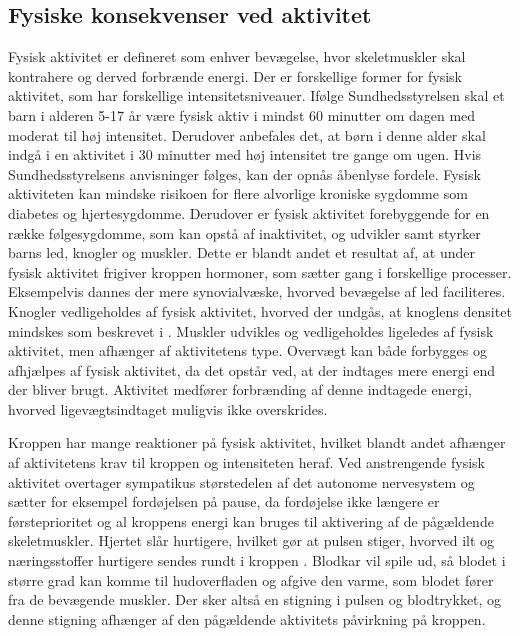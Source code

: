 \subsection{Fysiske konsekvenser ved aktivitet}\label{subsec:fysio_aktivitet}
Fysisk aktivitet er defineret som enhver bevægelse, hvor skeletmuskler skal kontrahere og derved forbrænde energi. Der er forskellige former for fysisk aktivitet, som har forskellige intensitetsniveauer. \citep{Academic2016a} Ifølge Sundhedsstyrelsen skal et barn i alderen 5-17 år være fysisk aktiv i mindst 60 minutter om dagen med moderat til høj intensitet. Derudover anbefales det, at børn i denne alder skal indgå i en aktivitet i 30 minutter med høj intensitet tre gange om ugen. \citep{Sundhedsstyrelsen2016} Hvis Sundhedsstyrelsens anvisninger følges, kan der opnås åbenlyse fordele. Fysisk aktiviteten kan mindske risikoen for flere alvorlige kroniske sygdomme som diabetes og hjertesygdomme. Derudover er fysisk aktivitet forebyggende for en række følgesygdomme, som kan opstå af inaktivitet, og udvikler samt styrker barns led, knogler og muskler. Dette er blandt andet et resultat af, at under fysisk aktivitet frigiver kroppen hormoner, som sætter gang i forskellige processer. Eksempelvis dannes der mere synovialvæske, hvorved bevægelse af led faciliteres. Knogler vedligeholdes af fysisk aktivitet, hvorved der undgås, at knoglens densitet mindskes som beskrevet i . Muskler udvikles og vedligeholdes ligeledes af fysisk aktivitet, men afhænger af aktivitetens type. Overvægt kan både forbygges og afhjælpes af fysisk aktivitet, da det opstår ved, at der indtages mere energi end der bliver brugt. Aktivitet medfører forbrænding af denne indtagede energi, hvorved ligevægtsindtaget muligvis ikke overskrides. \citep{Academic2016a,Smith1991,Academic2016b,Cotman2007,CenterforDiseaseControlandPrevention2015}

Kroppen har mange reaktioner på fysisk aktivitet, hvilket blandt andet afhænger af aktivitetens krav til kroppen og intensiteten heraf. Ved anstrengende fysisk aktivitet overtager sympatikus størstedelen af det autonome nervesystem og sætter for eksempel fordøjelsen på pause, da fordøjelse ikke længere er førsteprioritet og al kroppens energi kan bruges til aktivering af de pågældende skeletmuskler. Hjertet slår hurtigere, hvilket gør at pulsen stiger, hvorved ilt og næringsstoffer hurtigere sendes rundt i kroppen \citep{Hjerteforeningen}. Blodkar vil spile ud, så blodet i større grad kan komme til hudoverfladen og afgive den varme, som blodet fører fra de bevægende muskler. Der sker altså en stigning i pulsen og blodtrykket, og denne stigning afhænger af den pågældende aktivitets påvirkning på kroppen. \citep{Martini2012,Stanfield2013,Berchtold2010}

